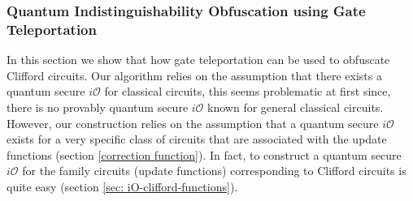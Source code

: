 





\subsubsection{Quantum Indistinguishability Obfuscation using Gate Teleportation}
\label{sec:Clifford-iO-teleportaion}
In this section we  show that how gate teleportation can be used to obfuscate Clifford circuits. Our algorithm relies on the assumption that there exists a quantum secure $i\mathcal{O}$ for classical circuits, this seems problematic at first since, there is no provably quantum secure $i\mathcal{O}$ known for general classical circuits. 
However,  our construction relies on the assumption that a quantum secure $i\mathcal{O}$ exists for a very specific class of circuits that are associated with the update functions (section \ref{correction function}). In fact,  to construct a quantum secure $i\mathcal{O}$ for the family circuits (update functions) corresponding to Clifford circuits is quite easy (section \ref{sec: iO-clifford-functions}). 




